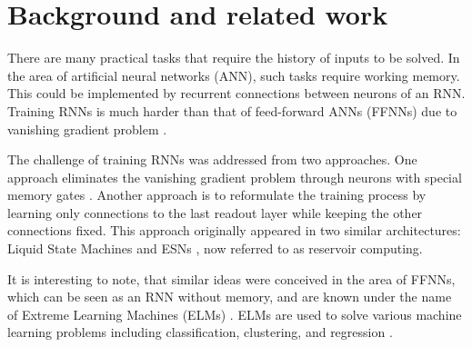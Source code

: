 \section{Background and related work}
\label{sect:related}




There are many practical tasks that require the history of inputs to be solved.
In the area of artificial neural networks (ANN), such tasks require working memory. This could be implemented by recurrent connections between neurons of an RNN. 
Training RNNs is much harder than that of feed-forward ANNs (FFNNs) due to vanishing gradient problem \cite{Bengio94}.

The challenge of training RNNs was addressed from two approaches. 
One approach eliminates the vanishing gradient problem through neurons with special memory gates \cite{LSTM97}. 
Another approach is to reformulate the training process by learning only connections to
the last readout layer while keeping the other connections fixed.
This approach originally appeared in two similar architectures: Liquid State Machines
\cite{LSM02} and ESNs \cite{ESN03}, now referred to as reservoir computing\cite{RC09}.


It is interesting to note, that similar ideas were conceived in the area of
FFNNs, which can be seen as an RNN without memory, and are known under the name
of Extreme Learning Machines (ELMs) \cite{ELM06}.
ELMs are used to solve various machine learning problems including
classification, clustering, and regression \cite{ELM15}.

